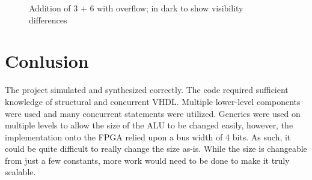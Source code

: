 \documentclass[12pt]{article}
\begin{document}
\begin{figure}[H]
\begin{center}
\caption{Addition of 3 + 6 with overflow; in dark to show visibility differences}
\label{fig:boardsimdark}
\end{center}
\end{figure}

\section{Conlusion} \label{cncl}
The project simulated and synthesized correctly.  The code required sufficient knowledge of structural and concurrent VHDL.  Multiple lower-level components were used and many concurrent statements were utilized.  Generics were used on multiple levels to allow the size of the ALU to be changed easily, however, the implementation onto the FPGA relied upon a bus width of 4 bits.  As such, it could be quite difficult to really change the size as-is.  While the size is changeable from  just a few constants, more work would need to be done to make it truly scalable.
\end{document}
